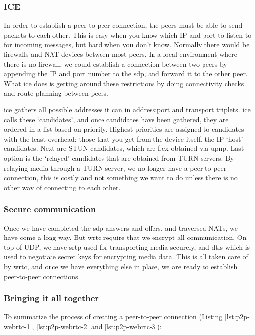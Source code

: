 \subsubsection{ICE}
\label{sec:ice}
In order to establish a peer-to-peer connection, the peers must be able to send packets to each other. This is easy when you know which IP and port to listen to for incoming messages, but hard when you don't know. Normally there would be firewalls and NAT devices between most peers. In a local environment where there is no firewall, we could establish a connection between two peers by appending the IP and port number to the \gls{sdp}, and forward it to the other peer. What \gls{ice} does is getting around these restrictions by doing connectivity checks and route planning between peers.

\gls{ice} gathers all possible addresses it can in address:port and transport triplets\cite{ivov_ice_2013}. \gls{ice} calls these `candidates', and once candidates have been gathered, they are ordered in a list based on priority. Highest priorities are assigned to candidates with the least overhead: those that you get from the device itself, the IP `host' candidates. Next are STUN candidates, which are f.ex obtained via \gls{upnp}. Last option is the `relayed' candidates that are obtained from TURN servers. By relaying media through a TURN server, we no longer have a peer-to-peer connection, this is costly and not something we want to do unless there is no other way of connecting to each other.

\subsubsection{Secure communication}
Once we have completed the \gls{sdp} answers and offers, and traversed NATs, we have come a long way. But \gls{wrtc} require that we encrypt all communication. On top of UDP, we have \gls{srtp} used for transporting media securely, and \gls{dtls} which is used to negotiate secret keys for encrypting media data. This is all taken care of by \gls{wrtc}, and once we have everything else in place, we are ready to establish peer-to-peer connections.

\subsubsection{Bringing it all together}
To summarize the process of creating a peer-to-peer connection (Listing \ref{lst:p2p-webrtc-1}, \ref{lst:p2p-webrtc-2} and \ref{lst:p2p-webrtc-3}):

